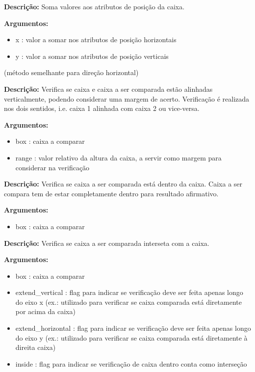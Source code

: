 
\textbf{Descrição:} Soma valores aos atributos de posição da caixa.

\textbf{Argumentos:}
\begin{itemize}\setlength\itemsep{-0.3em}
	\vspace{-0.5em}
	\item x : valor a somar nos atributos de posição horizontais
	\item y : valor a somar nos atributos de posição verticais
\end{itemize}

(método semelhante para direção horizontal)

\textbf{Descrição:} Verifica se caixa e caixa a ser comparada estão alinhadas verticalmente, podendo considerar uma margem de acerto. Verificação é realizada nos dois sentidos, i.e. caixa 1 alinhada com caixa 2 ou vice-versa.

\textbf{Argumentos:}
\begin{itemize}\setlength\itemsep{-0.3em}
	\vspace{-0.5em}
	\item box : caixa a comparar
	\item range : valor relativo da altura da caixa, a servir como margem para considerar na verificação
\end{itemize}


\textbf{Descrição:} Verifica se caixa a ser comparada está dentro da caixa. Caixa a ser compara tem de estar completamente dentro para resultado afirmativo.

\textbf{Argumentos:}
\begin{itemize}\setlength\itemsep{-0.3em}
	\vspace{-0.5em}
	\item box : caixa a comparar
\end{itemize}



\textbf{Descrição:} Verifica se caixa a ser comparada interseta com a caixa.

\textbf{Argumentos:}
\begin{itemize}\setlength\itemsep{-0.3em}
	\vspace{-0.5em}
	\item box : caixa a comparar
	\item extend\_vertical : flag para indicar se verificação deve ser feita apenas longo do eixo x (ex.: utilizado para verificar se caixa comparada está diretamente por acima da caixa)
	\item extend\_horizontal : flag para indicar se verificação deve ser feita apenas longo do eixo y (ex.: utilizado para verificar se caixa comparada está diretamente à direita caixa)
	\item inside : flag para indicar se verificação de caixa dentro conta como interseção
\end{itemize}



